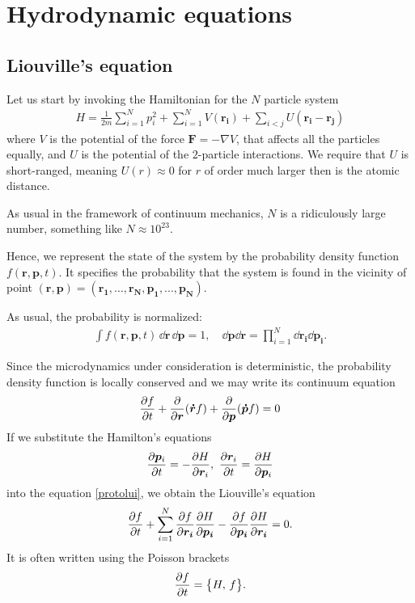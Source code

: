 \chapter{Hydrodynamic equations}
\section{Liouville's equation}
Let us start by invoking the Hamiltonian for the $N$ particle system
\begin{align*}
H = \frac{1}{2m} \sum_{i=1}^N p_i^2 + \sum_{i=1}^N V(\bm{r_i}) + \sum_{i<j} U(\bm{r_i} - \bm{r_j})
\end{align*}
where $V$ is the potential of the force $\bm{F}= -\nabla V$, that affects all the particles equally, and $U$ is the potential of the $2$-particle interactions. We require that $U$ is short-ranged, meaning $U(r) \approx 0$ for $r$ of order much larger then is the atomic distance.

As usual in the framework of continuum mechanics, $N$ is a ridiculously large number, something like $N \approx 10^{23}$.

Hence, we represent the state of the system by the probability density function $f(\bm{r},\bm{p},t)$. It specifies the probability that the system is found in the vicinity of point $(\bm{r},\bm{p}) = (\bm{r_1},...,\bm{r_N},\bm{p_1},...,\bm{p_N})$.

As usual, the probability is normalized:
\begin{align*}
\int f(\bm{r},\bm{p},t) \, \dd\bm{r} \, \dd\bm{p} = 1, \quad \dd\bm{p} \dd\bm{r} = \prod_{i=1}^N \dd \bm{r_i} \dd \bm{p_i}.
\end{align*}

Since the microdynamics under consideration is deterministic, the probability density function is locally conserved and we may write its continuum equation
\begin{align} \label{protolui}
\frac{\partial f}{\partial t} + \frac{\partial}{\partial \bm{r}} (\bm{\dot{r}} f) + \frac{\partial}{\partial \bm{p}} (\bm{\dot{p}} f) = 0
\end{align}
If we substitute the Hamilton's equations 
\begin{align*}
\frac{\partial \bm{p}_i}{\partial t} = - \frac{\partial H}{\partial \bm{r}_i},~ \frac{\partial \bm{r}_i}{\partial t} = \frac{\partial H}{\partial \bm{p}_i}
\end{align*}
into the equation \ref{protolui}, we obtain the Liouville's equation
\begin{align*}
\frac{\partial f}{\partial t} + \sum_{i=1}^N \frac{\partial f}{\partial \bm{r_i}} \frac{\partial H}{\partial \bm{p_i}} - \frac{\partial f}{\partial \bm{p_i}}\frac{\partial H}{\partial \bm{r_i}} = 0.
\end{align*}
It is often written using the Poisson brackets
\begin{align} \label{lui}
\frac{\partial f}{\partial t} = \big\{ H, \, f \big\}.
\end{align}

